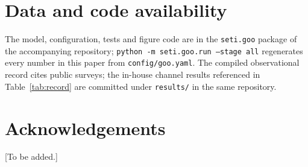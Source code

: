 \documentclass[11pt]{article}
\begin{document}
\section*{Data and code availability}
The model, configuration, tests and figure code are in the \texttt{seti.goo}
package of the accompanying repository; \texttt{python -m seti.goo.run --stage
all} regenerates every number in this paper from \texttt{config/goo.yaml}.  The
compiled observational record cites public surveys; the in-house channel
results referenced in Table~\ref{tab:record} are committed under
\texttt{results/} in the same repository.

\section*{Acknowledgements}
[To be added.]


\end{document}
